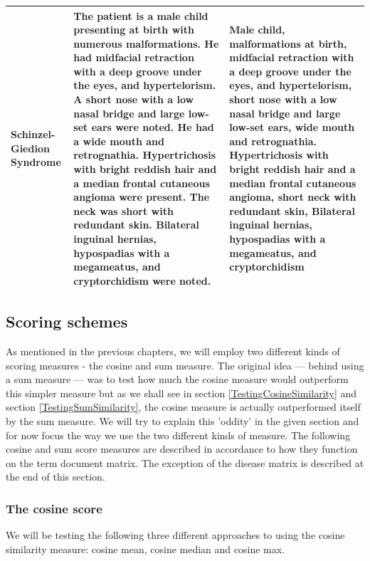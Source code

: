 \begin{table}[H]
\begin{scriptsize}
\begin{tabular}{| p{3cm} | p{4.5cm} | p{4.5cm} |}
Schinzel-Giedion Syndrome & The patient is a male child presenting at birth with numerous malformations. He had midfacial retraction with a deep groove under the eyes, and hypertelorism. A short nose with a low nasal bridge and large low-set ears were noted. He had a wide mouth and retrognathia. Hypertrichosis with bright reddish hair and a median frontal cutaneous angioma were present. The neck was short with redundant skin. Bilateral inguinal hernias, hypospadias with a megameatus, and cryptorchidism were noted. & Male child, malformations at birth, midfacial retraction with a deep groove under the eyes, and hypertelorism, short nose with a low nasal bridge and large low-set ears, wide mouth and retrognathia. Hypertrichosis with bright reddish hair and a median frontal cutaneous angioma, short neck with redundant skin, Bilateral inguinal hernias, hypospadias with a megameatus, and cryptorchidism \\
\hline
\end{tabular}
\end{scriptsize}
\end{table}

\subsection{Scoring schemes}

As mentioned in the previous chapters, we will employ two different
kinds of scoring measures - the cosine and sum measure. The original
idea --- behind using a sum measure --- was to test how much the cosine
measure would outperform this simpler measure but as we shall see in
section \ref{TestingCosineSimilarity} and section
\ref{TestingSumSimilarity}, the cosine measure is actually
outperformed itself by the sum measure. We will try to explain this
'oddity' in the given section and for now focus the way we use the two
different kinds of measure. The following cosine and sum score
measures are described in accordance to how they function on the term
document matrix. The exception of the disease matrix is described at
the end of this section.

\subsubsection{The cosine score\label{CosineScore}}

We will be testing the following three different approaches to using
the cosine similarity measure: cosine mean, cosine median and cosine
max.

